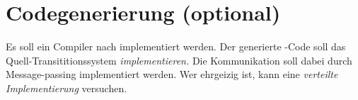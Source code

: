 \section{Codegenerierung (optional)}
\label{sec:codegenerierung}

Es soll ein Compiler nach \Java{} implementiert werden.  Der generierte
\Java-Code soll das Quell-Transititionssystem \emph{implementieren.}  Die
Kommunikation soll dabei durch Message-passing implementiert werden.  Wer
ehrgeizig ist, kann eine \emph{verteilte Implementierung} versuchen.



